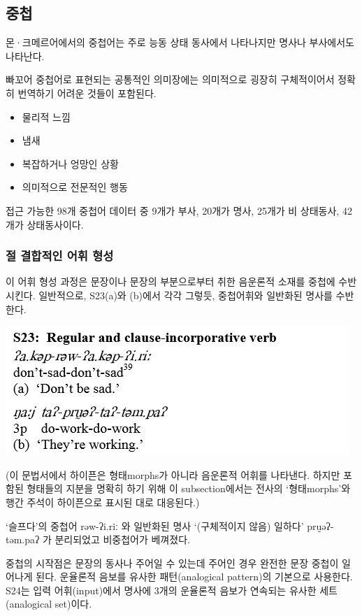 \subsection{중첩}
몬·크메르어에서의 중첩어는 주로 능동 상태 동사에서 나타나지만 명사나 부사에서도 나타난다. 

빠꼬어 중첩어로 표현되는 공통적인 의미장에는 의미적으로 굉장히 구체적이어서 정확히 번역하기 어려운 것들이 포함된다.
\begin{itemize}
\item 물리적 느낌
\item 냄새
\item 복잡하거나 엉망인 상황
\item 의미적으로 전문적인 행동
\end{itemize}

접근 가능한 98개 중첩어 데이터 중 9개가 부사, 20개가 명사, 25개가 비 상태동사, 42개가 상태동사이다.

\subsubsection{절 결합적인 어휘 형성}
이 어휘 형성 과정은 문장이나 문장의 부분으로부터 취한 음운론적 소재를 중첩에 수반시킨다. 일반적으로, S23(a)와 (b)에서 각각 그렇듯, 중첩어휘와 일반화된 명사를 수반한다.

\includegraphics{Pacoh/src/PacohS23}

(이 문법서에서 하이픈은 형태morphs가 아니라 음운론적 어휘를 나타낸다. 하지만 포함된 형태들의 지분을 명확히 하기 위해 이 subsection에서는 전사의 `형태morphs'와 행간 주석이 하이픈으로 표시된 대로 대응된다.)

`슬프다'의 중첩어 rəw-ʔi.riː 와 일반화된 명사 `(구체적이지 않음) 일하다' prṵəʔ-təm.paʔ 가 분리되었고 비중첩어가 베껴졌다.

중첩의 시작점은 문장의 동사나 주어일 수 있는데 주어인 경우 완전한 문장 중첩이 일어나게 된다. 운율론적 음보를 유사한 패턴(analogical pattern)의 기본으로 사용한다. S24는 입력 어휘(input)에서 명사에 3개의 운율론적 음보가 연속되는 유사한 세트(analogical set)이다. 

